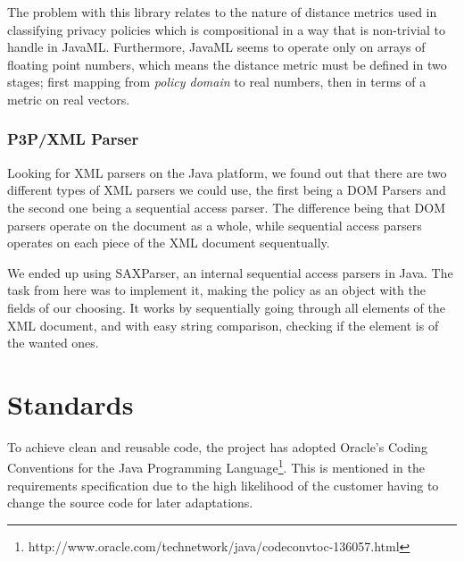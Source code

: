The problem with this library relates to the nature of distance metrics used in classifying privacy policies which is compositional in a way that is non-trivial to handle in JavaML. Furthermore, JavaML seems to operate only on arrays of floating point numbers, which means the distance metric must be defined in two stages; first mapping from \emph{policy domain} to real numbers, then in terms of a metric on real vectors.

\subsubsection{P3P/XML Parser}
Looking for XML parsers on the Java platform, we found out that there are two different types of XML parsers we could use, the first being a DOM Parsers and the second one being a sequential access parser. The difference being that DOM parsers operate on the document as a whole, while sequential access parsers operates on each piece of the XML document sequentually.

We ended up using SAXParser, an internal sequential access parsers in Java. The task from here was to implement it, making the policy as an object with the fields of our choosing. It works by sequentially going through all elements of the XML document, and with easy string comparison, checking if the element is of the wanted ones.



\section{Standards}
To achieve clean and reusable code, the project has adopted Oracle's Coding Conventions for the Java Programming Language\footnote{http://www.oracle.com/technetwork/java/codeconvtoc-136057.html}. This is mentioned in the requirements specification due to the high likelihood of the customer having to change the source code for later adaptations.
